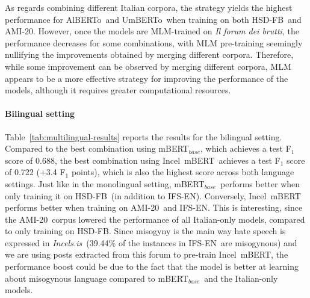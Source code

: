 \documentclass[11pt]{article}
\newcommand{\dsITcorpus}{IFU-22-IT}
\newcommand{\dsENclassification}{IFS-EN}
\newcommand{\mbert}{\mbox{mBERT$_{base}$}}
\newcommand{\imbert}{\mbox{Incel mBERT}}
\newcommand{\umbert}{\mbox{UmBERTo}}
\newcommand{\albert}{\mbox{AlBERTo}}
\newcommand{\iumbert}{\mbox{Incel UmBERTo}}
\newcommand{\ialbert}{\mbox{Incel AlBERTo}}
\newcommand{\hsdfb}{\mbox{HSD-FB}}
\newcommand{\hsdtw}{\mbox{HSD-TW}}
\newcommand{\ami}{\mbox{AMI-20}}
\newcommand{\enforum}{\textit{Incels.is}}
\newcommand{\itforum}{\textit{Il forum dei brutti}}
\begin{document}
As regards combining different Italian corpora, the strategy yields the highest performance for \albert\, and \umbert\, when training on both \hsdfb\, and \ami.
However, once the models are MLM-trained on \itforum, the performance decreases for some combinations, with MLM pre-training seemingly nullifying the improvements obtained by merging different corpora. Therefore, while some improvement can be observed by merging different corpora, MLM appears to be a more effective strategy for improving the performance of the models, although it requires greater computational resources.

\paragraph{Bilingual setting}
Table~\ref{tab:multilingual-results} reports the results for the bilingual setting.
Compared to the best combination using \mbert, which achieves a test F$_1$ score of 0.688, the best combination using \imbert\, achieves a test F$_1$ score of 0.722 (+3.4 F$_1$ points), which is also the highest score across both language settings. Just like in the monolingual setting, \mbert\, performs better when only training it on \hsdfb\, (in addition to \dsENclassification). Conversely, \imbert\, performs better when training on \ami\, and \dsENclassification. This is interesting, since the \ami\, corpus lowered the performance of all Italian-only models, compared to only training on \hsdfb. Since misogyny is the main way hate speech is expressed in \enforum\, (39.44\% of the instances in \dsENclassification\, are misogynous) and
we are using posts extracted from this forum to pre-train \imbert, the performance boost could be due to the fact that the model is better at learning about misogynous language compared to \mbert\, and the Italian-only models.
\end{document}
